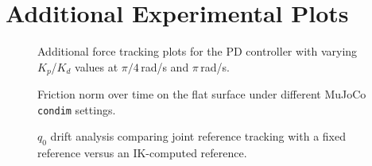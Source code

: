 \documentclass[
	german,%
	accentcolor=9c,%
	ruledheaders=section,%
	class=report,%
	thesis={type=bachelor},%
	fontsize=11pt,%
	parskip=half-,%
	custommargins=true,%
	marginpar=false,%
]{tudapub}
\begin{document}


\chapter{Additional Experimental Plots}

\begin{figure}[htbp]
    \centering
    \caption{Additional force tracking plots for the PD controller with
             varying $K_p$/$K_d$ values at $\pi/4$\,rad/s and
             $\pi$\,rad/s.}
    \label{fig:pd_gains_sweep}
\end{figure}

\begin{figure}[htbp]
    \centering
    \caption{Friction norm over time on the flat surface under different
             MuJoCo \texttt{condim} settings.}
    \label{fig:friction_condim}
\end{figure}

\begin{figure}[htbp]
    \centering
    \caption{$q_0$ drift analysis comparing joint reference tracking with a
             fixed reference versus an IK-computed reference.}
    \label{fig:q0_drift}
\end{figure}


%
\end{document}
